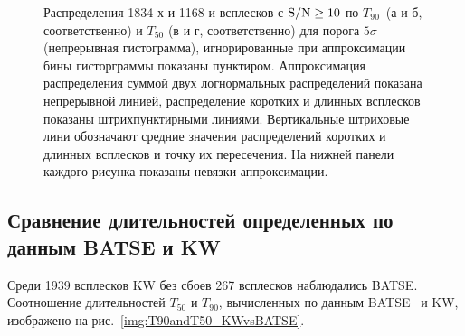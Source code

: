 \begin{figure}[h]
  \begin{minipage}[h]{0.5\textwidth}
  \end{minipage}
  \hfill
  \begin{minipage}[h]{0.5\textwidth}
  \end{minipage}
  \vfill
  \begin{minipage}[h]{0.5\textwidth}
  \end{minipage}
  \hfill
  \begin{minipage}[h]{0.5\textwidth}
  \end{minipage}
  \caption[Распределения 1834-х и 1168-и всплесков с $\rmn{S/N}\geq 10$ по $T_{90}$ и~$T_{50}$]
  {Распределения 1834-х и 1168-и всплесков с $\rmn{S/N}\geq 10$ по $T_{90}$~(а и б, соответственно) и 
  $T_{50}$ (в и г, соответственно) для порога $5\sigma$ (непрерывная гистограмма), 
  игнорированные при аппроксимации бины гисторграммы показаны пунктиром. 
  Аппроксимация распределения суммой двух логнормальных распределений  показана 
  непрерывной линией, распределение коротких и длинных всплесков показаны 
  штрихпунктирными линиями.  Вертикальные штриховые лини обозначают средние значения 
  распределений коротких и длинных всплесков и точку их пересечения. 
  На нижней панели каждого рисунка показаны невязки аппроксимации.}
  \label{img:T90andT50s5}  
\end{figure}

\begin{landscape}

\end{landscape}

\subsection{Сравнение длительностей определенных по данным BATSE и KW}
Среди 1939 всплесков KW без сбоев 267 всплесков наблюдались BATSE. 
Соотношение длительностей $T_{50}$ и $T_{90}$, вычисленных по данным BATSE~\citep{Paciesas_1999} 
и KW, изображено на рис.~\ref{img:T90andT50_KWvsBATSE}.

